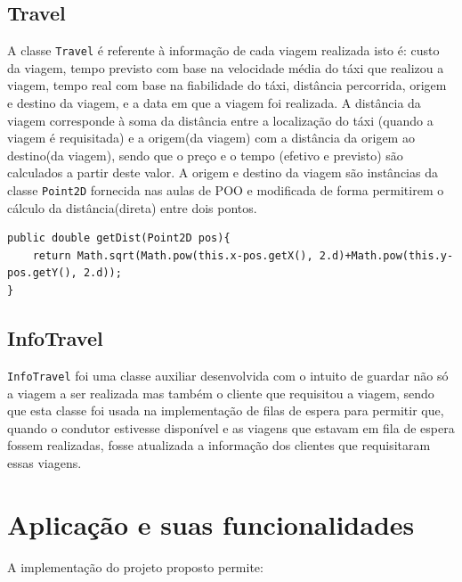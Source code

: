\documentclass[a4paper,10pt,portuguese]{article}
\begin{document}
\subsection{Travel}
A classe \texttt{Travel} é referente à informação de cada viagem realizada isto é: custo da viagem, tempo previsto com base na velocidade média do táxi que realizou a viagem, tempo real com base na fiabilidade do táxi, distância percorrida, origem e destino da viagem, e a data em que a viagem foi realizada. A distância da viagem corresponde à soma da distância entre a localização do táxi (quando a viagem é requisitada) e a origem(da viagem) com a distância da origem ao destino(da viagem), sendo que o preço e o tempo (efetivo e previsto) são calculados a partir deste valor. A origem e destino da viagem são instâncias da classe \texttt{Point2D} fornecida nas aulas de POO e modificada de forma permitirem o cálculo da distância(direta) entre dois pontos.
\begin{verbatim}
public double getDist(Point2D pos){
    return Math.sqrt(Math.pow(this.x-pos.getX(), 2.d)+Math.pow(this.y-pos.getY(), 2.d));
}
\end{verbatim}

\subsection{InfoTravel}
\label{InfoTravel}
\texttt{InfoTravel} foi uma classe auxiliar desenvolvida com o intuito de guardar não só a viagem a ser realizada mas também o cliente que requisitou a viagem, sendo que esta classe foi usada na implementação de filas de espera para permitir que, quando o condutor estivesse disponível e as viagens que estavam em fila de espera fossem realizadas, fosse atualizada a informação dos clientes que requisitaram essas viagens.

\section{Aplicação e suas funcionalidades}
A implementação do projeto proposto permite:
\end{document}
